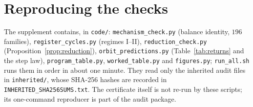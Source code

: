 \documentclass[11pt,a4paper]{article}
\theoremstyle{definition}
\begin{document}
\section{Reproducing the checks}\label{app:repro}
The supplement contains, in \texttt{code/}: \texttt{mechanism\_check.py} (balance identity, $196$ families), \texttt{register\_cycles.py} (regimes I--II), \texttt{reduction\_check.py} (Proposition~\ref{prop:reduction}), \texttt{orbit\_predictions.py} (Table~\ref{tab:returns} and the step law), \texttt{program\_table.py}, \texttt{worked\_table.py} and \texttt{figures.py}; \texttt{run\_all.sh} runs them in order in about one minute. They read only the inherited audit files in \texttt{inherited/}, whose SHA-256 hashes are recorded in \texttt{INHERITED\_SHA256SUMS.txt}. The certificate itself is not re-run by these scripts; its one-command reproducer is part of the audit package.
\end{document}
